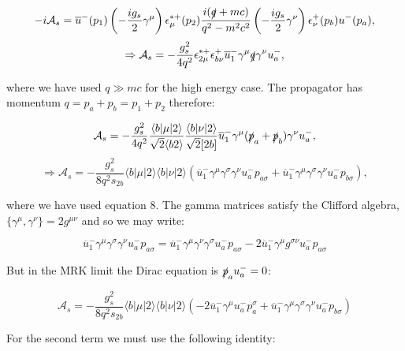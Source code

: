 			\begin{equation}
			-i\mathcal{A}_s=\overline{u}^-(p_1)\left(-\frac{ig_s}{2}\gamma^\mu\right)\epsilon_\mu^{*+}(p_2)\frac{i(\slashed q+mc)}{q^2-m^2c^2}\left(-\frac{ig_s}{2}\gamma^\nu\right)\epsilon^+_\nu(p_b)u^-(p_a),
			\end{equation}
			\begin{equation*}
			\Rightarrow \mathcal{A}_s=-\frac{g^2_s}{4q^2}\epsilon^{*+}_{2\mu}\epsilon^+_{b\nu}\overline{u}^-_1\gamma^\mu\slashed q\gamma^\nu u^-_a,
			\end{equation*}

			where we have used $q\gg mc$ for the high energy case.  The propagator has momentum $q=p_a+p_b=p_1+p_2$ therefore:

			\begin{equation}
			\mathcal{A}_s=-\frac{g^2_s}{4q^2}\frac{\langle{b}|\mu|2\rangle}{\sqrt{2}\langle{b2\rangle}}\frac{\langle{b}|\nu|2\rangle}{\sqrt{2}[2b]}\overline{u}^-_1\gamma^\mu(\slashed{p}_a+\slashed{p}_b)\gamma^\nu u^-_a,
			\end{equation}
			\begin{equation*}
			\Rightarrow\mathcal{A}_s=-\frac{g^2_s}{8q^2s_{2b}}\langle{b}|\mu|2\rangle\langle{b}|\nu|2\rangle\left(\overline{u}^-_1\gamma^\mu\gamma^\sigma\gamma^\nu u^-_ap_{a\sigma}+\overline{u}^-_1\gamma^\mu\gamma^\sigma\gamma^\nu u^-_ap_{b\sigma}\right),
			\end{equation*}

			where we have used equation 8.  The gamma matrices satisfy the Clifford algebra, $\{\gamma^\mu, \gamma^\nu\}=2g^{\mu\nu}$ and so we may write:

			\begin{equation}
			\overline{u}^-_1\gamma^\mu\gamma^\sigma\gamma^\nu u^-_ap_{a\sigma}=\overline{u}^-_1\gamma^\mu\gamma^\nu\gamma^\sigma u^-_ap_{a\sigma} - 2\overline{u}^-_1\gamma^\mu g^{\sigma\nu}u^-_ap_{a\sigma}
			\end{equation}

			But in the MRK limit the Dirac equation is $\slashed{p}_au^-_a=0$:

			\begin{equation}
			\mathcal{A}_s=-\frac{g^2_s}{8q^2s_{2b}}\langle{b}|\mu|2\rangle\langle{b}|\nu|2\rangle\left(-2\overline{u}^-_1\gamma^\mu u^-_ap_{a}^\sigma+\overline{u}^-_1\gamma^\mu\gamma^\sigma\gamma^\nu u^-_ap_{b\sigma}\right)
			\end{equation}

			For the second term we must use the following identity:


